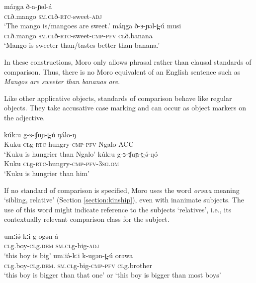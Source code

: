 \ea 
	\ea \gll máŋga 	ð-a-ɲəl-á	\\
			\textsc{cl}ð.mango 	\textsc{sm}.\textsc{cl}ð-\textsc{rtc}-sweet-\textsc{adj}\\
		\glt ‘The mango is/mangoes are sweet.’
	\ex	\gll máŋga 	ð-ɜ-ɲəl-t̪-ú 			musi	\\
			\textsc{cl}ð.mango 	\textsc{sm}.\textsc{cl}ð-\textsc{rtc}-sweet-\textsc{cmp}-\textsc{pfv}	\textsc{cl}ð.banana\\
		\glt	‘Mango is sweeter than/tastes better than banana.’
\z 	\z 

In these constructions, Moro only allows phrasal rather than clausal standards of comparison. Thus, there is no Moro equivalent of an English sentence such as \textit{Mangos are sweeter than bananas are}.

Like other applicative objects, standards of comparison behave like regular objects. They take accusative case marking and can occur as object markers on the adjective.

\ea
	\ea \gll 	kúk:u     		g-ɜ-ʧuɲ-t̪-ú                           ŋálo-ŋ\\
 Kuku  	\textsc{cl}g-\textsc{rtc}-hungry-\textsc{cmp}-\textsc{pfv}  	 Ngalo-ACC\\
		\glt  ‘Kuku is hungrier than Ngalo’
	\ex \gll kúk:u  	g-ɜ-ʧuɲ-t̪-ə́-ŋó             \\            	 	
			Kuku  	\textsc{cl}g-\textsc{rtc}-hungry-\textsc{cmp}-\textsc{pfv}-3\textsc{sg.om}  	 \\
		\glt	‘Kuku is hungrier than him’
	\z
\z 


If no standard of comparison is specified, Moro uses the word \textit{orəwa} meaning ‘sibling, relative’ (Section \ref{section:kinship}), even with inanimate subjects. The use of this word might indicate reference to the subjects `relatives', i.e., its contextually relevant comparison class for the subject.

\ea 
	\ea \gll umːiə́-kːi 		g-ogən-á\\
	\textsc{cl}g.boy-\textsc{cl}g.\textsc{dem}	\textsc{sm}.\textsc{cl}g-big-\textsc{adj}	\\
		\glt ‘this boy is big’
	\ex \gll  umːiə́-kːi 		k-ugən-t̪-ú 			orəwa\\
			\textsc{cl}g.boy-\textsc{cl}g.\textsc{dem}.	\textsc{sm}.\textsc{cl}g-big-\textsc{cmp}-\textsc{pfv}	\textsc{cl}g.brother\\
		\glt ‘this boy is bigger than that one’ or ‘this boy is bigger than most boys’
	\z \z 
	
